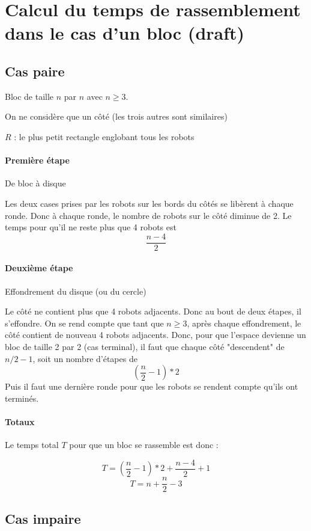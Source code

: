 \documentclass[11pt, a4paper]{article}
\theoremstyle{plain}
\theoremstyle{definition}
\theoremstyle{remark}
\begin{document}
\section{Calcul du temps de rassemblement dans le cas d'un bloc (draft)}

\subsection{Cas paire}

Bloc de taille $n$ par $n$ avec $n \geq 3$.

On ne considère que un côté (les trois autres sont similaires)

$R$ : le plus petit rectangle englobant tous les robots

\paragraph{Première étape} De bloc à disque

Les deux cases prises par les robots sur les bords du côtés se libèrent à
chaque ronde. Donc à chaque ronde, le nombre de robots sur le côté diminue de
2. Le temps pour qu'il ne reste plus que 4 robots est
\[ \frac{n-4}{2} \]

\paragraph{Deuxième étape} Effondrement du disque (ou du cercle)

Le côté ne contient plus que 4 robots adjacents. Donc au bout de deux
étapes, il s'effondre. On se rend compte que tant que $n \geq 3$,
après chaque effondrement, le côté contient de nouveau 4 robots adjacents. Donc,
pour que l'espace devienne un bloc de taille 2 par 2 (cas terminal), il faut
que chaque côté "descendent" de $n/2-1$, soit un nombre d'étapes de
\[ ( \frac{n}{2} -1 ) *2 \]
Puis il faut une dernière ronde pour que les robots se rendent compte qu'ils
ont terminés.

\paragraph{Totaux} Le temps total $T$ pour que un bloc se rassemble
est donc :

\[ T = ( \frac{n}{2} -1 ) *2 + \frac{n-4}{2} + 1 \]
\[ T = n + \frac{n}{2} - 3 \]


\subsection{Cas impaire}
\end{document}
